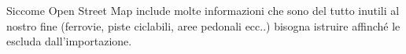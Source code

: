 Siccome Open Street Map include molte informazioni che sono del tutto inutili al nostro fine (ferrovie, piste ciclabili, aree pedonali ecc..) bisogna istruire  affinché le escluda dall'importazione. 


